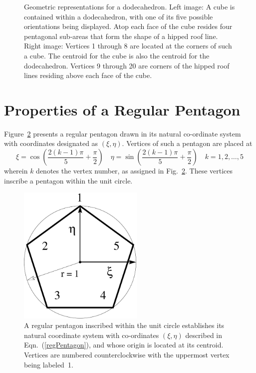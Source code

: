 \begin{figure}
{		\par}
	\caption{Geometric representations for a dodecahedron.  Left image:  A cube is contained within a dodecahedron, with one of its five possible orientations being displayed.  Atop each face of the cube resides four pentagonal sub-areas that form the shape of a hipped roof line.  Right image:  Vertices 1 through 8 are located at the corners of such a cube.  The centroid for the cube is also the centroid for the dodecahedron.  Vertices 9 through 20 are corners of the hipped roof lines residing above each face of the cube.}
	\label{figDodecahedron}
\end{figure}

\section{Properties of a Regular Pentagon}

Figure~\ref{figRegPentagon} presents a regular pentagon drawn in its natural co-ordinate system with co\-ordinates designated as $(\xi, \eta)$.  Vertices of such a pentagon are placed at
\begin{equation}
	\xi = \cos \left( \frac{2(k-1)\pi}{5} + \frac{\pi}{2} \right) \quad
	\eta = \sin \left( \frac{2(k-1)\pi}{5} + \frac{\pi}{2} \right) \quad
	k = 1, 2, \ldots, 5
	\label{regPentagon}
\end{equation}
wherein $k$ denotes the vertex number, as assigned in Fig.~\ref{figRegPentagon}.  These vertices inscribe a pentagon within the unit circle.

\begin{figure}
	\centering
	\includegraphics[width=6cm]{figures/regPentagon.pdf}
	\caption{A regular pentagon inscribed within the unit circle establishes its natural co\-ordinate system with co-ordinates $(\xi, \eta)$ described in Eqn.~(\ref{regPentagon}), and whose origin is located at its centroid.  Vertices are numbered counterclockwise with the uppermost vertex being labeled~1.}
	\label{figRegPentagon}
\end{figure}

